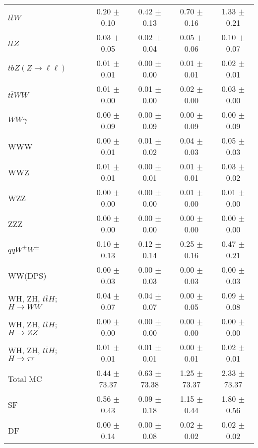 \begin{tabular}{l|cccc}
                   $t\overline{t}W$ &  0.20 $\pm$  0.10 &  0.42 $\pm$  0.13 &  0.70 $\pm$  0.16 &  1.33 $\pm$  0.21 \\
                   $t\overline{t}Z$ &  0.03 $\pm$  0.05 &  0.02 $\pm$  0.04 &  0.05 $\pm$  0.06 &  0.10 $\pm$  0.07 \\
    $tbZ (Z \rightarrow \ell \ell)$ &  0.01 $\pm$  0.01 &  0.00 $\pm$  0.00 &  0.01 $\pm$  0.01 &  0.02 $\pm$  0.01 \\
                  $t\overline{t}WW$ &  0.01 $\pm$  0.00 &  0.01 $\pm$  0.00 &  0.02 $\pm$  0.00 &  0.03 $\pm$  0.00 \\
                         $WW\gamma$ &  0.00 $\pm$  0.09 &  0.00 $\pm$  0.09 &  0.00 $\pm$  0.09 &  0.00 $\pm$  0.09 \\
                                WWW &  0.00 $\pm$  0.01 &  0.01 $\pm$  0.02 &  0.04 $\pm$  0.03 &  0.05 $\pm$  0.03 \\
                                WWZ &  0.01 $\pm$  0.01 &  0.00 $\pm$  0.01 &  0.01 $\pm$  0.01 &  0.03 $\pm$  0.02 \\
                                WZZ &  0.00 $\pm$  0.00 &  0.00 $\pm$  0.00 &  0.01 $\pm$  0.00 &  0.01 $\pm$  0.00 \\
                                ZZZ &  0.00 $\pm$  0.00 &  0.00 $\pm$  0.00 &  0.00 $\pm$  0.00 &  0.00 $\pm$  0.00 \\
                 $qqW^{\pm}W^{\pm}$ &  0.10 $\pm$  0.13 &  0.12 $\pm$  0.14 &  0.25 $\pm$  0.16 &  0.47 $\pm$  0.21 \\
                            WW(DPS) &  0.00 $\pm$  0.03 &  0.00 $\pm$  0.03 &  0.00 $\pm$  0.03 &  0.00 $\pm$  0.03 \\
WH, ZH, $t\bar{t}H$; $H \rightarrow WW$ &  0.04 $\pm$  0.07 &  0.04 $\pm$  0.07 &  0.00 $\pm$  0.05 &  0.09 $\pm$  0.08 \\
WH, ZH, $t\bar{t}H$; $H \rightarrow ZZ$ &  0.00 $\pm$  0.00 &  0.00 $\pm$  0.00 &  0.00 $\pm$  0.00 &  0.00 $\pm$  0.00 \\
WH, ZH, $t\bar{t}H$; $H \rightarrow \tau\tau$ &  0.01 $\pm$  0.01 &  0.01 $\pm$  0.01 &  0.00 $\pm$  0.01 &  0.02 $\pm$  0.01 \\
\hline\hline
                           Total MC &  0.44 $\pm$ 73.37 &  0.63 $\pm$ 73.38 &  1.25 $\pm$ 73.37 &  2.33 $\pm$ 73.37 \\
\hline
                                 SF &  0.56 $\pm$  0.43 &  0.09 $\pm$  0.18 &  1.15 $\pm$  0.44 &  1.80 $\pm$  0.56 \\
                                 DF &  0.00 $\pm$  0.14 &  0.00 $\pm$  0.08 &  0.02 $\pm$  0.02 &  0.02 $\pm$  0.02 \\

\end{tabular}
